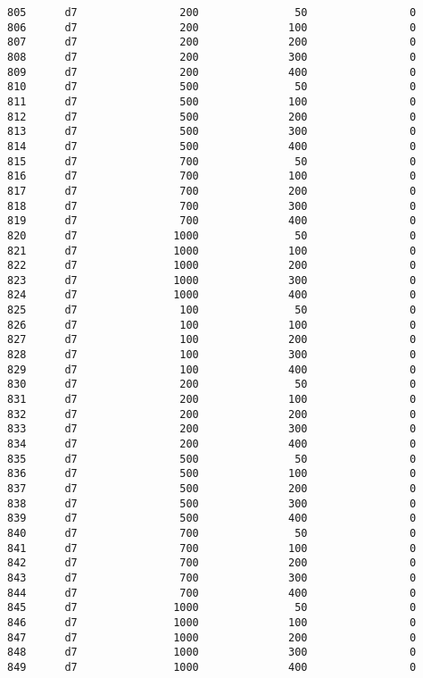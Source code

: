 \documentclass[11pt]{article}
\begin{document}
\begin{Verbatim}[commandchars=\\\{\}]
805      d7                200               50                0   
806      d7                200              100                0   
807      d7                200              200                0   
808      d7                200              300                0   
809      d7                200              400                0   
810      d7                500               50                0   
811      d7                500              100                0   
812      d7                500              200                0   
813      d7                500              300                0   
814      d7                500              400                0   
815      d7                700               50                0   
816      d7                700              100                0   
817      d7                700              200                0   
818      d7                700              300                0   
819      d7                700              400                0   
820      d7               1000               50                0   
821      d7               1000              100                0   
822      d7               1000              200                0   
823      d7               1000              300                0   
824      d7               1000              400                0   
825      d7                100               50                0   
826      d7                100              100                0   
827      d7                100              200                0   
828      d7                100              300                0   
829      d7                100              400                0   
830      d7                200               50                0   
831      d7                200              100                0   
832      d7                200              200                0   
833      d7                200              300                0   
834      d7                200              400                0   
835      d7                500               50                0   
836      d7                500              100                0   
837      d7                500              200                0   
838      d7                500              300                0   
839      d7                500              400                0   
840      d7                700               50                0   
841      d7                700              100                0   
842      d7                700              200                0   
843      d7                700              300                0   
844      d7                700              400                0   
845      d7               1000               50                0   
846      d7               1000              100                0   
847      d7               1000              200                0   
848      d7               1000              300                0   
849      d7               1000              400                0   


\end{Verbatim}
\end{document}
